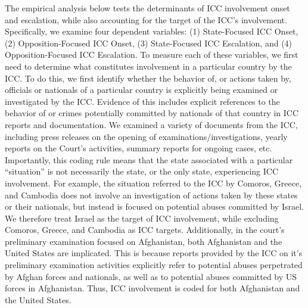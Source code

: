 The empirical analysis below tests the determinants of ICC involvement onset and escalation, while also accounting for the target of the ICC’s involvement.  Specifically, we examine four dependent variables: (1) State-Focused ICC Onset, (2) Opposition-Focused ICC Onset, (3) State-Focused ICC Escalation, and (4) Opposition-Focused ICC Escalation.  To measure each of these variables, we first need to determine what constitutes involvement in a particular country by the ICC.  To do this, we first identify whether the behavior of, or actions taken by, officials or nationals of a particular country is explicitly being examined or investigated by the ICC.  Evidence of this includes explicit references to the behavior of or crimes potentially committed by nationals of that country in ICC reports and documentation.  We examined a variety of documents from the ICC, including press releases on the opening of examinations/investigations, yearly reports on the Court’s activities, summary reports for ongoing cases, etc. Importantly, this coding rule means that the state associated with a particular “situation” is not necessarily the state, or the only state, experiencing ICC involvement.  For example, the situation referred to the ICC by Comoros, Greece, and Cambodia does not involve an investigation of actions taken by these states or their nationals, but instead is focused on potential abuses committed by Israel.  We therefore treat Israel as the target of ICC involvement, while excluding Comoros, Greece, and Cambodia as ICC targets.  Additionally, in the court’s preliminary examination focused on Afghanistan, both Afghanistan and the United States are implicated.  This is because reports provided by the ICC on it’s preliminary examination activities explicitly refer to potential abuses perpetrated by Afghan forces and nationals, as well as to potential abuses committed by US forces in Afghanistan.  Thus, ICC involvement is coded for both Afghanistan and the United States.

